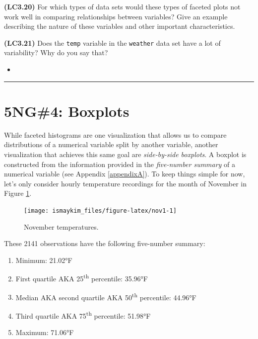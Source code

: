 \documentclass[12pt, krantz2,]{krantz}
\providecommand{\tightlist}{%
  \setlength{\itemsep}{0pt}\setlength{\parskip}{0pt}}
\newenvironment{rmdblock}[1]
  {\begin{shaded*}
  \begin{itemize}
  \renewcommand{\labelitemi}{
    \raisebox{-.7\height}[0pt][0pt]{
    }
  }
  \item
  }
  {
  \end{itemize}
  \end{shaded*}
  }
\newenvironment{learncheck}
  {\begin{rmdblock}{warning}}
  {\end{rmdblock}}
\begin{document}
\textbf{(LC3.20)} For which types of data sets would these types of faceted plots not work well in comparing relationships between variables? Give an example describing the nature of these variables and other important characteristics.

\textbf{(LC3.21)} Does the \texttt{temp} variable in the \texttt{weather} data set have a lot of variability? Why do you say that?

\begin{learncheck}

\end{learncheck}

\begin{center}\rule{0.5\linewidth}{\linethickness}\end{center}

\hypertarget{boxplots}{%
\section{5NG\#4: Boxplots}\label{boxplots}}

While faceted histograms are one visualization that allows us to compare distributions of a numerical variable split by another variable, another visualization that achieves this same goal are \emph{side-by-side boxplots}. A boxplot is constructed from the information provided in the \emph{five-number summary} of a numerical variable (see Appendix \ref{appendixA}). To keep things simple for now, let's only consider hourly temperature recordings for the month of November in Figure \ref{fig:nov1}.

\begin{figure}

{\centering \texttt{[image: ismaykim\_files/figure-latex/nov1-1]} 

}

\caption{November temperatures.}\label{fig:nov1}
\end{figure}

These 2141 observations have the following five-number summary:

\begin{enumerate}
\def\labelenumi{\arabic{enumi}.}
\tightlist
\item
  Minimum: 21.02°F
\item
  First quartile AKA 25\textsuperscript{th} percentile: 35.96°F
\item
  Median AKA second quartile AKA 50\textsuperscript{th} percentile: 44.96°F
\item
  Third quartile AKA 75\textsuperscript{th} percentile: 51.98°F
\item
  Maximum: 71.06°F
\end{enumerate}
\end{document}
